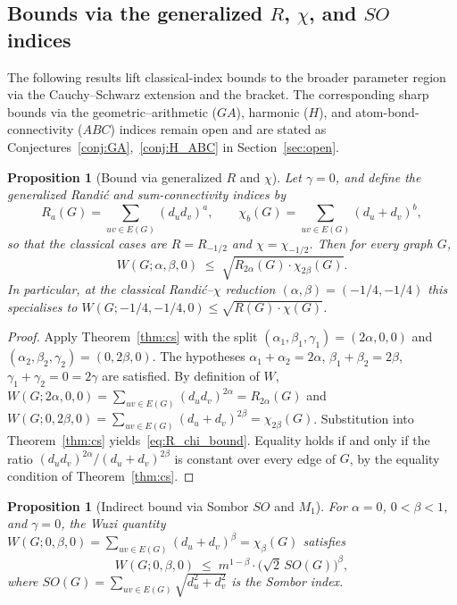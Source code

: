 \documentclass[11pt,a4paper]{article}
\newtheorem{proposition}[theorem]{Proposition}
\theoremstyle{definition}
\begin{document}
\subsection{Bounds via the generalized $R$, $\chi$, and $SO$ indices}\label{sub:R_chi_SO}

The following results lift classical-index bounds to the broader
parameter region via the Cauchy--Schwarz extension and the bracket.
The corresponding sharp bounds via the geometric--arithmetic ($GA$),
harmonic ($H$), and atom-bond-connectivity ($ABC$) indices remain
open and are stated as Conjectures~\ref{conj:GA},~\ref{conj:H_ABC}
in Section~\ref{sec:open}.

\begin{proposition}[Bound via generalized $R$ and $\chi$]\label{thm:R_chi}
Let $\gamma = 0$, and define the generalized Randi\'c and
sum-connectivity indices by
\[R_{a}(G) = \sum_{uv \in E(G)} (d_u d_v)^{a}, \qquad
  \chi_{b}(G) = \sum_{uv \in E(G)} (d_u + d_v)^{b},\]
so that the classical cases are $R = R_{-1/2}$ and
$\chi = \chi_{-1/2}$. Then for every graph $G$,
\begin{equation}\label{eq:R_chi_bound}
W(G;\alpha,\beta,0)\;\le\; \sqrt{R_{2\alpha}(G)\cdot \chi_{2\beta}(G)}.
\end{equation}
In particular, at the classical Randi\'c--$\chi$ reduction
$(\alpha, \beta) = (-1/4, -1/4)$ this specialises to
$W(G; -1/4, -1/4, 0) \le \sqrt{R(G) \cdot \chi(G)}$.
\end{proposition}

\begin{proof}
Apply Theorem~\ref{thm:cs} with the split
$(\alpha_1, \beta_1, \gamma_1) = (2\alpha, 0, 0)$ and
$(\alpha_2, \beta_2, \gamma_2) = (0, 2\beta, 0)$. The hypotheses
$\alpha_1 + \alpha_2 = 2\alpha$, $\beta_1 + \beta_2 = 2\beta$,
$\gamma_1 + \gamma_2 = 0 = 2\gamma$ are satisfied. By definition
of $W$,
$W(G; 2\alpha, 0, 0) = \sum_{uv \in E(G)} (d_u d_v)^{2\alpha} = R_{2\alpha}(G)$
and $W(G; 0, 2\beta, 0) = \sum_{uv \in E(G)} (d_u + d_v)^{2\beta} = \chi_{2\beta}(G)$.
Substitution into Theorem~\ref{thm:cs} yields~\eqref{eq:R_chi_bound}.
Equality holds if and only if the ratio
$(d_u d_v)^{2\alpha} / (d_u + d_v)^{2\beta}$ is constant over every
edge of $G$, by the equality condition of Theorem~\ref{thm:cs}.
\end{proof}

\begin{proposition}[Indirect bound via Sombor $SO$ and $M_1$]\label{thm:sombor}
For $\alpha = 0$, $0 < \beta < 1$, and $\gamma = 0$, the Wuzi
quantity $W(G; 0, \beta, 0) = \sum_{uv \in E(G)} (d_u + d_v)^{\beta}
= \chi_{\beta}(G)$ satisfies
\begin{equation}\label{eq:sombor_bound}
W(G; 0, \beta, 0) \;\le\; m^{1 - \beta} \cdot \bigl(\sqrt{2}\, SO(G)\bigr)^{\beta},
\end{equation}
where $SO(G) = \sum_{uv \in E(G)} \sqrt{d_u^2 + d_v^2}$ is the
Sombor index.
\end{proposition}
\end{document}
